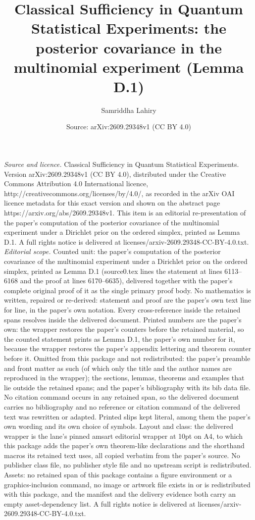 \documentclass[10pt,a4paper]{amsart}
\title[Classical sufficiency in quantum statistical experiments]{Classical Sufficiency in Quantum Statistical Experiments: the posterior covariance in the multinomial experiment (Lemma D.1)}
\author[S. Lahiry]{Samriddha Lahiry}
\date{Source: arXiv:2609.29348v1 (CC BY 4.0)}
\theoremstyle{named}
\theoremstyle{named1}
\theoremstyle{plain}
\theoremstyle{remark}
\begin{document}
\maketitle
\vspace{1em}
\noindent\textit{Source and licence.} Classical Sufficiency in Quantum Statistical Experiments. Version arXiv:2609.29348v1 (CC BY 4.0), distributed under the Creative Commons Attribution 4.0 International licence, http://creativecommons.org/licenses/by/4.0/, as recorded in the arXiv OAI licence metadata for this exact version and shown on the abstract page https://arxiv.org/abs/2609.29348v1. This item is an editorial re-presentation of the paper's computation of the posterior covariance of the multinomial experiment under a Dirichlet prior on the ordered simplex, printed as Lemma D.1. A full rights notice is delivered at licenses/arxiv-2609.29348-CC-BY-4.0.txt.
\noindent\textit{Editorial scope.} Counted unit: the paper's computation of the posterior covariance of the multinomial experiment under a Dirichlet prior on the ordered simplex, printed as Lemma D.1 (source0.tex lines the statement at lines 6113--6168 and the proof at lines 6170--6635), delivered together with the paper's complete original proof of it as the single primary proof body. No mathematics is written, repaired or re-derived: statement and proof are the paper's own text line for line, in the paper's own notation. Every cross-reference inside the retained spans resolves inside the delivered document. Printed numbers are the paper's own: the wrapper restores the paper's counters before the retained material, so the counted statement prints as Lemma D.1, the paper's own number for it, because the wrapper restores the paper's appendix lettering and theorem counter before it. Omitted from this package and not redistributed: the paper's preamble and front matter as such (of which only the title and the author names are reproduced in the wrapper); the sections, lemmas, theorems and examples that lie outside the retained spans; and the paper's bibliography with its bib data file. No citation command occurs in any retained span, so the delivered document carries no bibliography and no reference or citation command of the delivered text was rewritten or adapted. Printed slips kept literal, among them the paper's own wording and its own choice of symbols. Layout and class: the delivered wrapper is the lane's pinned amsart editorial wrapper at 10pt on A4, to which this package adds the paper's own theorem-like declarations and the shorthand macros its retained text uses, all copied verbatim from the paper's source. No publisher class file, no publisher style file and no upstream script is redistributed. Assets: no retained span of this package contains a figure environment or a graphics-inclusion command, no image or artwork file exists in or is redistributed with this package, and the manifest and the delivery evidence both carry an empty asset-dependency list. A full rights notice is delivered at licenses/arxiv-2609.29348-CC-BY-4.0.txt.
\end{document}
